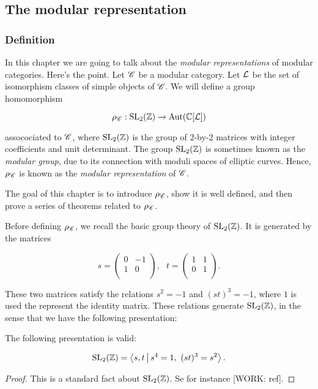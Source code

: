 \subsection{The modular representation}

\subsubsection{Definition}

In this chapter we are going to talk about the \textit{modular representations} of modular categories. Here's the point. Let $\mathscr{C}$ be a modular category. Let $\mathcal{L}$ be the set of isomorphism classes of simple objects of $\mathscr{C}$. We will define a group homomorphism

$$\rho_{\mathscr{C}}:\operatorname{SL}_2(\mathbb{Z})\xrightarrow{}\operatorname{Aut}(\mathbb{C}[\mathcal{L}])$$

assocociated to $\mathscr{C}$, where $\operatorname{SL}_2(\mathbb{Z})$ is the group of $2$-by-$2$ matrices with integer coefficients and unit determinant. The group $\operatorname{SL}_2(\mathbb{Z})$ is sometimes known as the \textit{modular group}, due to its connection with moduli spaces of elliptic curves. Hence, $\rho_{\mathscr{C}}$ is known as the \textit{modular representation} of $\mathscr{C}$.

The goal of this chapter is to introduce $\rho_{\mathscr{C}}$, show it is well defined, and then prove a series of theorems related to $\rho_{\mathscr{C}}$.

Before defining $\rho_{\mathscr{C}}$, we recall the basic group theory of $\operatorname{SL}_2(\mathbb{Z})$. It is generated by the matrices

$$
s=
\begin{pmatrix}
0 & -1 \\
1 & 0 \\
\end{pmatrix},
\,\,\,\,
t=
\begin{pmatrix}
1 & 1 \\
0 & 1 \\
\end{pmatrix}.
$$

These two matrices satisfy the relations $s^2=-1$ and $(st)^3=-1$, where $1$ is used the represent the identity matrix. These relations generate $\operatorname{SL}_2(\mathbb{Z})$, in the sense that we have the following presentation:

\begin{proposition} The following presentation is valid:

$$\operatorname{SL}_2(\mathbb{Z})=\Braket{s,t | s^4=1,\,\, (st)^3=s^2}.$$
\end{proposition}
\begin{proof} This is a standard fact about $\operatorname{SL}_2(\mathbb{Z})$. Se for instance [WORK: ref].
\end{proof}

